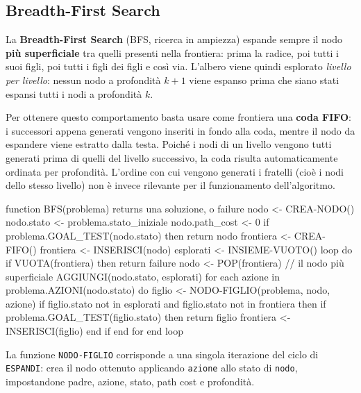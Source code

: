 \documentclass[a4paper, 11pt, oneside]{book}
\theoremstyle{definition}
\begin{document}
	\subsection{Breadth-First Search}
	La \textbf{Breadth-First Search} (BFS, ricerca in ampiezza) espande sempre il nodo
	\textbf{pi\`u superficiale} tra quelli presenti nella frontiera: prima la radice,
	poi tutti i suoi figli, poi tutti i figli dei figli e cos\`i via. L'albero viene
	quindi esplorato \emph{livello per livello}: nessun nodo a profondit\`a $k+1$ viene
	espanso prima che siano stati espansi tutti i nodi a profondit\`a $k$.

	Per ottenere questo comportamento basta usare come frontiera una \textbf{coda FIFO}:
	i successori appena generati vengono inseriti in fondo alla coda, mentre il nodo da
	espandere viene estratto dalla testa. Poich\'e i nodi di un livello vengono tutti
	generati prima di quelli del livello successivo, la coda risulta automaticamente
	ordinata per profondit\`a. L'ordine con cui vengono generati i fratelli (cio\`e i nodi
	dello stesso livello) non \`e invece rilevante per il funzionamento dell'algoritmo.

\begin{codice}
function BFS(problema) returns una soluzione, o failure
    nodo <- CREA-NODO()
    nodo.stato <- problema.stato_iniziale
    nodo.path_cost <- 0
    if problema.GOAL_TEST(nodo.stato) then return nodo
    frontiera <- CREA-FIFO()
    frontiera <- INSERISCI(nodo)
    esplorati <- INSIEME-VUOTO()
    loop do
        if VUOTA(frontiera) then return failure
        nodo <- POP(frontiera)         // il nodo più superficiale
        AGGIUNGI(nodo.stato, esplorati)
        for each azione in problema.AZIONI(nodo.stato) do
            figlio <- NODO-FIGLIO(problema, nodo, azione)
            if figlio.stato not in esplorati and figlio.stato not in frontiera then
                if problema.GOAL_TEST(figlio.stato) then return figlio
                frontiera <- INSERISCI(figlio)
            end if
        end for
    end loop
\end{codice}

	La funzione \texttt{NODO-FIGLIO} corrisponde a una singola iterazione del ciclo di
	\texttt{ESPANDI}: crea il nodo ottenuto applicando \texttt{azione} allo stato di
	\texttt{nodo}, impostandone padre, azione, stato, path cost e profondit\`a.
\end{document}
